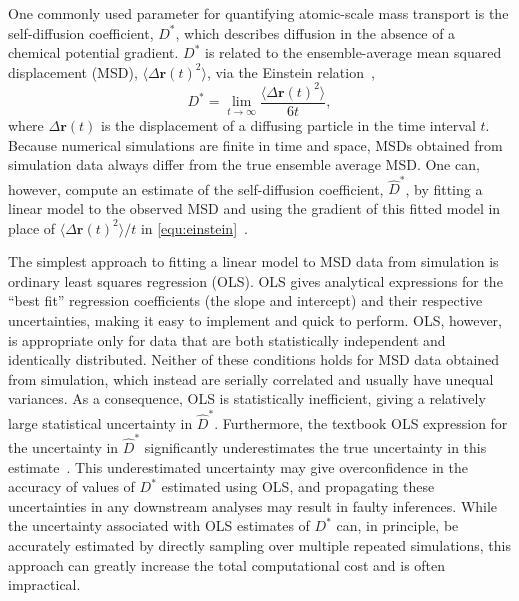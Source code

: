 \documentclass[reprint,superscriptaddress,nobibnotes,amsmath,amssymb,aps,prx,hidelinks]{revtex4-2}
\newcommand{\MSD}[1]{\big\langle\Delta\mathbf{r}{(#1)}^2\big\rangle}
\newcommand{\Dest}{\ensuremath{\widehat{D}^*}}
\newcommand{\D}{\ensuremath{D^*}}
\begin{document}
One commonly used parameter for quantifying atomic-scale mass transport is the self-diffusion coefficient, $\D$, which describes diffusion in the absence of a chemical potential gradient.
$\D$ is related to the ensemble-average mean squared displacement (MSD), $\MSD{t}$, via the Einstein relation~\cite{einstein_uber_1905,helfand_transport_1960},
\begin{equation}
    \D = \lim_{t\to\infty}\frac{\MSD{t}}{6t},
    \label{equ:einstein}
\end{equation}
where $\Delta\mathbf{r}{(t)}$ is the displacement of a diffusing particle in the time interval $t$.
Because numerical simulations are finite in time and space, MSDs obtained from simulation data always differ from the true ensemble average MSD.
One can, however, compute an estimate of the self-diffusion coefficient, $\Dest$, by fitting a linear model to the observed MSD and using the gradient of this fitted model in place of $\MSD{t} / t$ in \cref{equ:einstein}~\cite{Note1,VestergaardEtAl_PhysRevE2014,KrapfEtAl_NewJournalPhysics2018,bullerjohn_optimal_2020}.

The simplest approach to fitting a linear model to MSD data from simulation is ordinary least squares regression (OLS).
OLS gives analytical expressions for the ``best fit'' regression coefficients (the slope and intercept) and their respective uncertainties, making it easy to implement and quick to perform.
OLS, however, is appropriate only for data that are both statistically independent and identically distributed.
Neither of these conditions holds for MSD data obtained from simulation, which instead are serially correlated and usually have unequal variances.
As a consequence, OLS is statistically inefficient, giving a relatively large statistical uncertainty in $\Dest$.
Furthermore, the textbook OLS expression for the uncertainty in $\Dest$ significantly underestimates the true uncertainty in this estimate~\cite{UslerEtAl_JComputChem2023}.
This underestimated uncertainty may give overconfidence in the accuracy of values of $\D$ estimated using OLS, and propagating these uncertainties in any downstream analyses may result in faulty inferences.
While the uncertainty associated with OLS estimates of $\D$ can, in principle, be accurately estimated by directly sampling over multiple repeated simulations, this approach can greatly increase the total computational cost and is often impractical.
\end{document}
